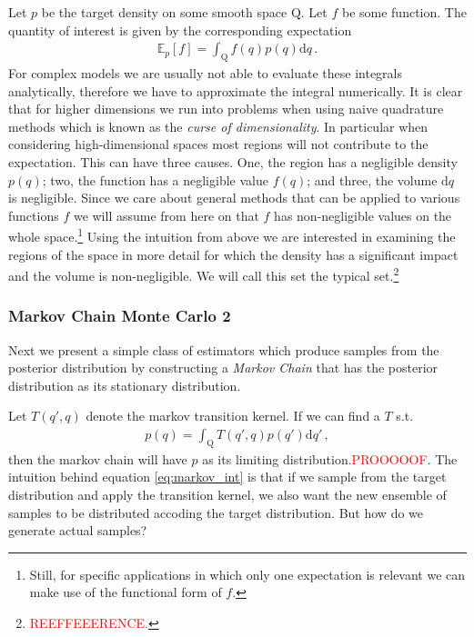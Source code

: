 Let $p$ be the target density on some smooth space $\mathrm{Q}$.
Let $f$ be some function.
The quantity of interest is given by the corresponding expectation
\begin{align}
    \mathbb{E}_p \left[f\right] = \int_{\mathrm{Q}} f(q) p(q) \mathrm{d}q \,.
\end{align}
For complex models we are usually not able to evaluate these integrals analytically,
therefore we have to approximate the integral numerically.
It is clear that for higher dimensions we run into problems when using naive
quadrature methods which is known as the \emph{curse of dimensionality}.
In particular when considering high-dimensional spaces most regions will not
contribute to the expectation. This can have three causes. One, the region has a
negligible density $p(q)$; two, the function has a negligible value $f(q)$;
and three, the volume $\mathrm{d}q$ is negligible. Since we care about general
methods that can be applied to various functions $f$ we will assume from here on
that $f$ has non-negligible values on the whole space.\footnote{Still, for specific applications
in which only one expectation is relevant we can make use of the functional form of
$f$.}
Using the intuition from above we are interested in examining the regions of the
space in more detail for which the density has a significant impact and the
volume is non-negligible. We will call this set the typical set.\footnote{\textcolor{red}{REEFFEEERENCE.}}

\subsubsection{Markov Chain Monte Carlo 2}
Next we present a simple class of estimators which produce samples from the posterior
distribution by constructing a \emph{Markov Chain} that has the posterior distribution
as its stationary distribution.

Let $T(q', q)$ denote the markov transition kernel. If we can find a $T$ s.t.
\begin{align}
  p(q) = \int_{\mathrm{Q}} T(q', q) p(q') \mathrm{d}q' \,,
  \label{eq:markov_int}
\end{align}
then the markov chain will have $p$ as its limiting distribution.\textcolor{red}{PROOOOOF}.
The intuition behind equation \ref{eq:markov_int} is that if we sample from the
target distribution and apply the transition kernel, we also want the new ensemble of
samples to be distributed accoding the target distribution. But how do we generate
actual samples?


